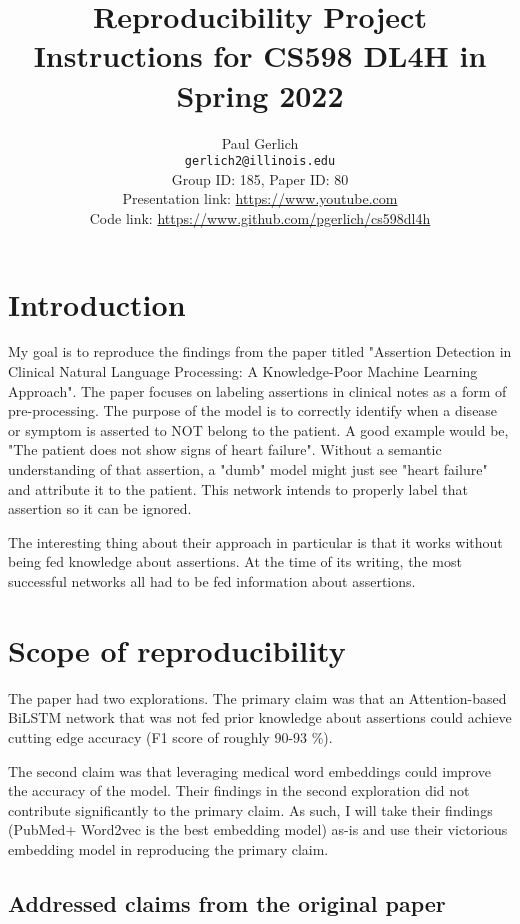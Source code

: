 \documentclass[11pt,a4paper]{article}
\title{Reproducibility Project Instructions for CS598 DL4H in Spring 2022}
\author{Paul Gerlich \\
  \texttt{gerlich2@illinois.edu}
  \\[2em]
  Group ID: 185, Paper ID: 80\\
  Presentation link: \url{https://www.youtube.com} \\
  Code link: \url{https://www.github.com/pgerlich/cs598dl4h}}
\begin{document}
\maketitle


\section{Introduction}
My goal is to reproduce the findings from the paper titled "Assertion Detection in Clinical Natural Language Processing: A Knowledge-Poor Machine Learning Approach". The paper focuses on labeling assertions in clinical notes as a form of pre-processing. The purpose of the model is to correctly identify when a disease or symptom is asserted to NOT belong to the patient. A good example would be, "The patient does not show signs of heart failure". Without a semantic understanding of that assertion, a "dumb" model might just see "heart failure" and attribute it to the patient. This network intends to properly label that assertion so it can be ignored.

The interesting thing about their approach in particular is that it works without being fed knowledge about assertions. At the time of its writing, the most successful networks all had to be fed information about assertions.

\section{Scope of reproducibility}

The paper had two explorations. The primary claim was that an Attention-based BiLSTM network that was not fed prior knowledge about assertions could achieve cutting edge accuracy (F1 score of roughly 90-93 \%).

The second claim was that leveraging medical word embeddings could improve the accuracy of the model. Their findings in the second exploration did not contribute significantly to the primary claim. As such, I will take their findings (PubMed+ Word2vec is the best embedding model) as-is and use their victorious embedding model in reproducing the primary claim.

\subsection{Addressed claims from the original paper}
\end{document}
